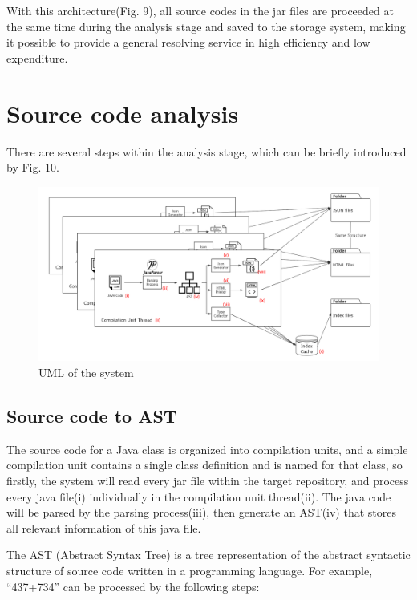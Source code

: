 \documentclass[runningheads]{llncs}
\begin{document}
With this architecture(Fig. 9), all source codes in the jar files are proceeded at the same time during the analysis stage and saved to the storage system, making it possible to provide a general resolving service in high efficiency and low expenditure.

\section{Source code analysis}

There are several steps within the analysis stage, which can be briefly introduced by Fig. 10.

\begin{figure}[H]
	\centering
	\includegraphics[width=12cm]{pic/AnalysisFlow.png}
	\caption{UML of the system}
	\label{Source code analysis process}
\end{figure}

\subsection{Source code to AST}

The source code for a Java class is organized into compilation units, and a simple compilation unit contains a single class definition and is named for that class\cite{learningJava_2013}, so firstly, the system will read every jar file within the target repository, and process every java file(i) individually in the compilation unit thread(ii). The java code will be parsed by the parsing process(iii), then generate an AST(iv) that stores all relevant information of this java file.

The AST (Abstract Syntax Tree) is a tree representation of the abstract syntactic structure of source code written in a programming language.\cite{AST_introduction} For example, “437+734” can be processed by the following steps:
\end{document}

